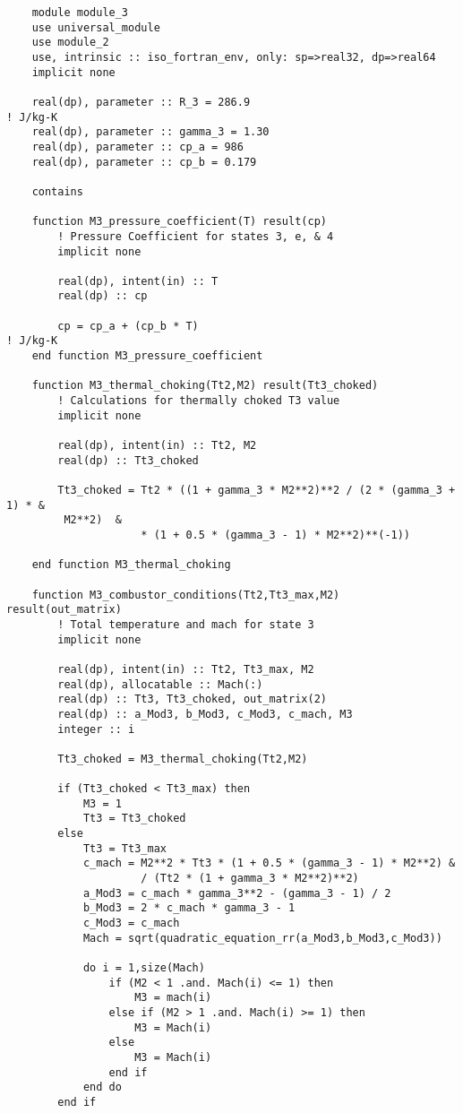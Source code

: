 \begin{verbatim}
    module module_3
    use universal_module
    use module_2
    use, intrinsic :: iso_fortran_env, only: sp=>real32, dp=>real64
    implicit none

    real(dp), parameter :: R_3 = 286.9                                  ! J/kg-K
    real(dp), parameter :: gamma_3 = 1.30
    real(dp), parameter :: cp_a = 986
    real(dp), parameter :: cp_b = 0.179

    contains

    function M3_pressure_coefficient(T) result(cp)
        ! Pressure Coefficient for states 3, e, & 4
        implicit none

        real(dp), intent(in) :: T
        real(dp) :: cp

        cp = cp_a + (cp_b * T)                                          ! J/kg-K
    end function M3_pressure_coefficient

    function M3_thermal_choking(Tt2,M2) result(Tt3_choked)
        ! Calculations for thermally choked T3 value
        implicit none

        real(dp), intent(in) :: Tt2, M2
        real(dp) :: Tt3_choked

        Tt3_choked = Tt2 * ((1 + gamma_3 * M2**2)**2 / (2 * (gamma_3 + 1) * &
         M2**2)  &
                     * (1 + 0.5 * (gamma_3 - 1) * M2**2)**(-1))

    end function M3_thermal_choking

    function M3_combustor_conditions(Tt2,Tt3_max,M2) result(out_matrix)
        ! Total temperature and mach for state 3
        implicit none

        real(dp), intent(in) :: Tt2, Tt3_max, M2
        real(dp), allocatable :: Mach(:)
        real(dp) :: Tt3, Tt3_choked, out_matrix(2)
        real(dp) :: a_Mod3, b_Mod3, c_Mod3, c_mach, M3
        integer :: i

        Tt3_choked = M3_thermal_choking(Tt2,M2)

        if (Tt3_choked < Tt3_max) then
            M3 = 1
            Tt3 = Tt3_choked
        else
            Tt3 = Tt3_max
            c_mach = M2**2 * Tt3 * (1 + 0.5 * (gamma_3 - 1) * M2**2) &
                     / (Tt2 * (1 + gamma_3 * M2**2)**2)
            a_Mod3 = c_mach * gamma_3**2 - (gamma_3 - 1) / 2
            b_Mod3 = 2 * c_mach * gamma_3 - 1
            c_Mod3 = c_mach
            Mach = sqrt(quadratic_equation_rr(a_Mod3,b_Mod3,c_Mod3))

            do i = 1,size(Mach)
                if (M2 < 1 .and. Mach(i) <= 1) then
                    M3 = mach(i)
                else if (M2 > 1 .and. Mach(i) >= 1) then
                    M3 = Mach(i)
                else
                    M3 = Mach(i)
                end if
            end do
        end if


\end{verbatim}
